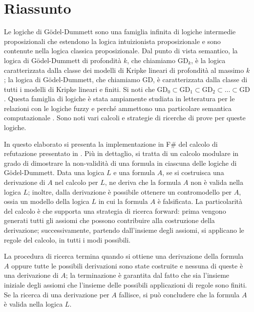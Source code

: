 \documentclass{oist}
\begin{document}
\section*{Riassunto}

Le logiche di G\"odel-Dummett sono una famiglia infinita di logiche
intermedie proposizionali che estendono la logica intuizionista
proposizionale
e sono contenute nella logica classica proposizionale.
Dal punto di vista semantico, la logica di  G\"odel-Dummett di profondit\`a
$k$,
che chiamiamo $\mathrm{GD}_k$,
\`e la logica caratterizzata dalla classe dei modelli di Kripke lineari
di profondit\`a
al massimo $k$; la logica di  G\"odel-Dummett,  che chiamiamo $\mathrm{GD}$,
\`e caratterizzata dalla classe di tutti i  modelli di Kripke lineari e finiti.
Si noti che $\mathrm{GD}_0\subset\mathrm{GD}_1
    \subset\mathrm{GD}_2\subset\dots\subset \mathrm{GD}$.
Questa famiglia di logiche \`e stata ampiamente studiata in letteratura
per le relazioni con le logiche
fuzzy \cite{Hajek:98} e perch\'e ammettono una particolare semantica computazionale
\cite{AscCiaGen:2017,Avron:91b}.
Sono noti vari calcoli e strategie di ricerche di prove per queste logiche.

In questo elaborato si presenta la implementazione in F\# del calcolo di
refutazione
presentato in \cite{cilc:2022}.
Pi\`u in dettaglio,
si tratta di un calcolo modulare in grado di dimostrare
la non-validit\`a di una formula in ciascuna delle logiche di
G\"odel-Dummett.
Data una logica $L$ e una formula $A$, se si costruisca una derivazione
di $A$ nel calcolo per $L$,
ne deriva che la formula $A$ non \`e valida nella logica $L$;
inoltre, dalla derivazione \`e possibile ottenere un contromodello per
$A$, ossia un modello
della logica $L$ in cui la formula $A$ \`e falsificata.
La particolarit\`a del calcolo \`e che supporta una strategia di ricerca
forward: prima vengono
generati tutti gli assiomi che possono contribuire alla costruzione
della derivazione;
successivamente, partendo dall'insieme degli assiomi, si applicano le
regole del calcolo, in tutti i modi possibili.

La procedura di ricerca termina quando si ottiene una derivazione della
formula $A$ oppure tutte le possibili derivazioni sono state costruite
e nessuna di queste \`e una derivazione di $A$; la terminazione \`e
garantita
dal fatto che sia l'insieme iniziale degli assiomi che l'insieme delle
possibili applicazioni di regole sono finiti.
Se la ricerca di una derivazione per $A$ fallisce,
si pu\`o concludere che la formula $A$ \`e valida nella logica $L$.
\end{document}
